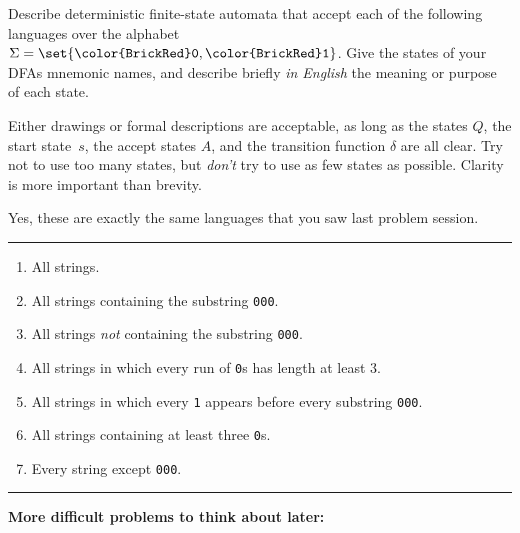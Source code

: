 \documentclass[11pt]{article}
\def\Sym#1{\texttt{\color{BrickRed}#1}}
\begin{document}

\noindent
Describe deterministic finite-state automata that accept each of the following languages over the alphabet $\Sigma = \set{\Sym0,\Sym1}$.  Give the states of your DFAs mnemonic names, and describe briefly \emph{in English} the meaning or purpose of each state.  

Either drawings or formal descriptions are acceptable, as long as the states $Q$, the start state~$s$, the accept states $A$, and the transition function $\delta$ are all  clear.  Try not to use too many states, but \emph{don’t} try to use as few states as possible.  Clarity is more important than brevity.

Yes, these are exactly the same languages that you saw last problem session.

\bigskip\hrule\bigskip
\begin{enumerate}
\parindent 1.5em 

\item[0.]
All strings.

\item
All strings containing the substring \Sym{000}.

\item
All strings \emph{not} containing the substring \Sym{000}.

\item
All strings in which every run of \Sym0s has length at least $3$.

\item
All strings in which every \Sym1 appears before every substring \Sym{000}.

\item
All strings containing at least three \Sym0s.

\item
Every string except \Sym{000}.  

\end{enumerate}


\bigskip\hrule\bigskip
\noindent\textbf{More difficult problems to think about later:}
\end{document}
